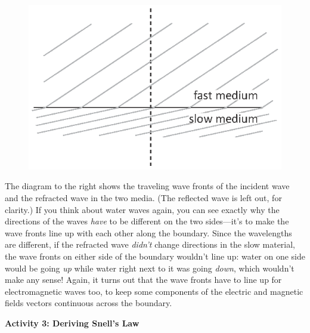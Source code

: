 \begin{figure}
\begin{flushright}
\vspace{-0.2in}
{\includegraphics{deriving_snells_law/wave_fronts.eps}}
\end{flushright}
\end{figure}

The diagram to the right shows the traveling wave fronts of the incident wave and the refracted wave in the two media.  (The reflected wave is left out, for clarity.)  If you think about water waves again, you can see exactly why the directions of the waves \textit{have} to be different on the two sides---it's to make the wave fronts line up with each other along the boundary.  Since the wavelengths are different, if the refracted wave \textit{didn't} change directions in the slow material, the wave fronts on either side of the boundary wouldn't line up: water on one side would be going \textit{up} while water right next to it was going \textit{down}, which wouldn't make any sense!  Again, it turns out that the wave fronts have to line up for electromagnetic waves too, to keep some components of the electric and magnetic fields vectors continuous across the boundary.

\bigskip
\textbf{Activity 3: Deriving Snell's Law}

